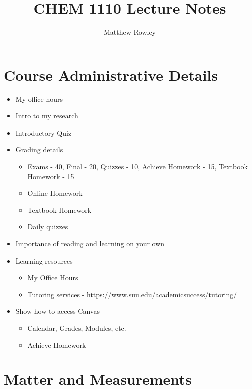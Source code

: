 \documentclass[12pt, openany, letterpaper]{memoir}
\begin{document}
\title{CHEM 1110 Lecture Notes}
\author{Matthew Rowley}
\mainmatter
\maketitle

\chapter*{Course Administrative Details}
\begin{itemize}
	\item My office hours
	\item Intro to my research
	\item Introductory Quiz
	\item Grading details
	      \begin{itemize}
		      \item Exams - 40, Final - 20, Quizzes - 10, Achieve Homework - 15, Textbook Homework - 15
		      \item Online Homework
		      \item Textbook Homework
		      \item Daily quizzes
	      \end{itemize}
	\item Importance of reading and learning on your own
	\item Learning resources
	      \begin{itemize}
		      \item My Office Hours
		      \item Tutoring services - https://www.suu.edu/academicsuccess/tutoring/
	      \end{itemize}
	\item Show how to access Canvas
	      \begin{itemize}
		      \item Calendar, Grades, Modules, etc.
		      \item Achieve Homework
	      \end{itemize}
\end{itemize}

\chapter{Matter and Measurements}
\end{document}
